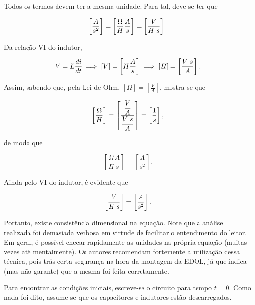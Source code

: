 \documentclass{article}
\numberwithin{equation}{section}
\let\l\left
\let\r\right
\let\dfr\dfrac
\begin{document}
\noindent Todos os termos devem ter a mesma unidade. Para tal, deve-se ter que

\begin{equation*}
    \l[\dfr{A}{s^2} \r] = \l[ \dfr{\Omega}{H} \dfr{A}{s} \r] = \l[ \dfr{V}{H \hspace{1mm} s} \r].
\end{equation*}

\noindent Da relação VI do indutor,

\begin{equation*}
    V = L \dfr{di}{dt} \implies [V] = \l[ H \dfr{A}{s} \r] \implies [H] = \l[ \dfr{V \hspace{1mm} s}{A} \r].
\end{equation*}

\noindent Assim, sabendo que, pela Lei de Ohm, $[\Omega] = \l[\frac{V}{A}\r]$, mostra-se que

\begin{equation*}
    \l[ \dfr{\Omega}{H} \r] = \l[\dfr{\dfr{V}{A}}{\dfr{V \hspace{1mm} s}{A}}\r] = \l[\dfr{1}{s}\r],
\end{equation*}

\noindent de modo que

\begin{equation*}
    \l[\dfr{\Omega}{H} \dfr{A}{s}\r] = \l[ \dfr{A}{s^2} \r].
\end{equation*}

\noindent Ainda pelo VI do indutor, é evidente que

\begin{equation*}
    \l[\dfr{V}{H \hspace{1mm} s}\r] = \l[\dfr{A}{s^2}\r].
\end{equation*}

\noindent Portanto, existe consistência dimensional na equação. Note que a análise realizada foi demasiada verbosa em virtude de facilitar o entendimento do leitor. Em geral, é possível checar rapidamente as unidades na própria equação (muitas vezes até mentalmente). Os autores recomendam fortemente a utilização dessa técnica, pois trás certa segurança na hora da montagem da EDOL, já que indica (mas não garante) que a mesma foi feita corretamente.

\vspace{1cm}

\noindent Para encontrar as condições iniciais, escreve-se o circuito para tempo $t=0$. Como nada foi dito, assume-se que os capacitores e indutores estão descarregados.
\end{document}

